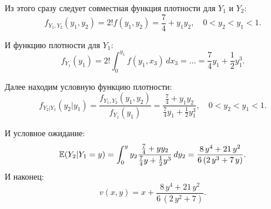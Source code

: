 \begin{enumerate}
\begin{enumerate}
Из этого сразу следует совместная функция плотности для $ Y_{1} $ и $ Y_{2} $:
\begin{equation}
f_{Y_{1},Y_{2}}(y_{1},y_{2})=2! f(y_{1},y_{2})=\frac{7}{4}+y_{1}y_{2}, \quad 0<y_{2}<y_{1}<1.
\end{equation}

И функцию плотности для $ Y_{1} $:
\begin{equation}
f_{Y_{1}}(y_{1})=2!\int_{0}^{y_{1}} f(y_{1},x_{3}) \, dx_{3} =
\ldots=\frac{7}{4}y_{1}+\frac{1}{2}y_{1}^{3}.
\end{equation}

Далее находим условную функцию плотности:
\begin{equation}
 f_{Y_{2}|Y_{1}}(y_{2}|y_{1})=\frac{f_{Y_{1},Y_{2}}(y_{1},y_{2})}{f_{Y_{1}}(y_{1})}=
 \frac{\frac{7}{4}+y_{1}y_{2}}{\frac{7}{4}y_{1}+\frac{1}{2}y_{1}^{3}}, \quad 0<y_{2}<y_{1}<1.
\end{equation}

И условное ожидание:
\begin{equation}
\operatorname{\mathbb{E}}(Y_{2}|Y_{1}=y)=\int_{0}^{y} y_{2} \frac{\frac{7}{4}+yy_{2}}{\frac{7}{4}y+\frac{1}{2}y^{3}} \, dy_{2}=\frac{8 \, y^{4} + 21 \, y^{2}}{6 \, {\left(2 \, y^{3} + 7 \, y\right)}}.
\end{equation}
И наконец:
\begin{equation}
v(x,y)=x+\frac{8 \, y^{4} + 21 \, y^{2}}{6 \, {\left(2 \, y^{2} + 7\right)}}.
\end{equation}

\end{enumerate}
\end{enumerate}
